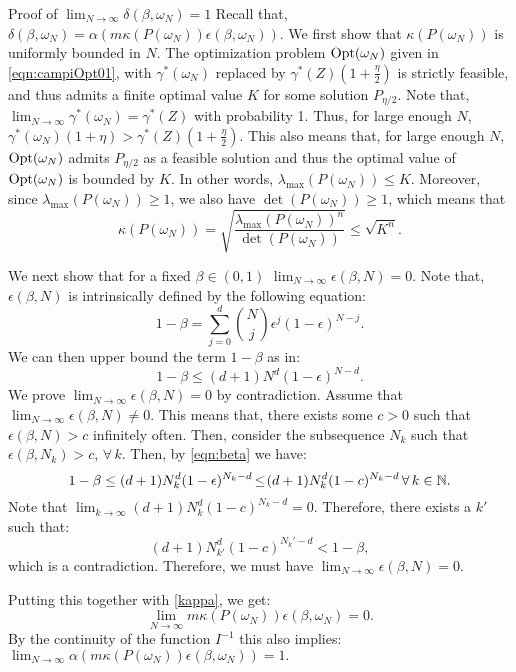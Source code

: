 \begin{subsection}{Proof of  $\lim_{N \to \infty}\delta(\beta, \omega_N) = 1$}
\label{app:bound}
Recall that, $\delta(\beta, \omega_N) = \alpha(m \kappa(P(\omega_N))\epsilon(\beta, \omega_N))$. We first show that $\kappa(P(\omega_N))$  is uniformly bounded in $N$. The optimization problem $\text{Opt}(\omega_N)$ given in \eqref{eqn:campiOpt01}, with $\gamma^*(\omega_N)$ replaced by $\gamma^*(Z)(1+\frac{\eta}{2})$ is strictly feasible, and thus admits a finite optimal value $K$ for some solution $P_{\eta/2}$. Note that, $\lim_{N \to \infty} \gamma^*(\omega_N)= \gamma^*(Z)$ with probability 1. Thus, for large enough $N$, \mbox{$\gamma^*(\omega_N)(1+\eta) > \gamma^*(Z)(1+\frac{\eta}{2})$.} This also means that, for large enough $N$, $\text{Opt}(\omega_N)$ admits $P_{\eta/2}$ as a feasible solution and thus the optimal value of $\text{Opt}(\omega_N)$ is bounded by $K.$ In other words, \mbox{$\lambda_{\max}(P({\omega_N})) \leq K$.} Moreover, since  
$\lambda_{\max}(P(\omega_N))\geq 1$, we also have \mbox{$\det(P(\omega_N)) \geq 1$,} which means that
\begin{equation}\label{kappa}\kappa(P(\omega_N)) = \sqrt{\frac{\lambda_{\max}(P(\omega_N))^n}{\det(P(\omega_N))}} \leq \sqrt{K^n}.\end{equation}

We next show that for a fixed $\beta \in (0,1)$ $\lim_{N \to \infty} \epsilon(\beta, N) = 0.$ Note that, $\epsilon(\beta, N)$ is intrinsically defined by the following equation:
$$1-\beta = \sum_{j=0}^d {{N}\choose{j}} \epsilon^j (1-\epsilon)^{N-j}.$$
We can then upper bound the term $1-\beta$ as in:
\begin{equation}\label{eqn:beta}1-\beta \leq  (d+1)N^d (1-\epsilon)^{N-d}.\end{equation}
We prove $\lim_{N \to \infty} \epsilon(\beta, N) = 0$ by contradiction. Assume that $\lim_{N \to \infty} \epsilon(\beta, N) \not= 0$. This means that, there exists some $c > 0$ such that $\epsilon(\beta, N) > c$ infinitely often. Then, consider the subsequence $N_k$ such that $\epsilon(\beta, N_k) > c$, $\forall\, k.$ Then, by \eqref{eqn:beta} we have:
\begin{equation*}1-\beta\leq  (d+1)N_k^d (1-\epsilon)^{N_k-d}\hspace{-0.4mm} \leq \hspace{-0.7mm}(d+1)N_k^d (1-c)^{N_k-d}\, \forall\,k \in \mathbb{N}. 
\end{equation*}
Note that $\lim_{k \to \infty}(d+1)N_k^d (1-c)^{N_k-d} = 0.$ Therefore, there exists a $k'$ such that:
$$(d+1)N_{k'}^d (1-c)^{N_k'-d} < 1 - \beta,$$ which is a contradiction. Therefore, we must have  $\lim_{N \to \infty} \epsilon (\beta, N) = 0$.

Putting this together with \eqref{kappa}, we get:
$$\lim_{N \to \infty} m \kappa(P(\omega_N))\epsilon(\beta, \omega_N) = 0.$$ By the continuity of the function $I^{-1}$ this also implies: $\lim_{N \to \infty} \alpha(m \kappa(P(\omega_N))\epsilon(\beta, \omega_N)) = 1.$


\end{subsection}








